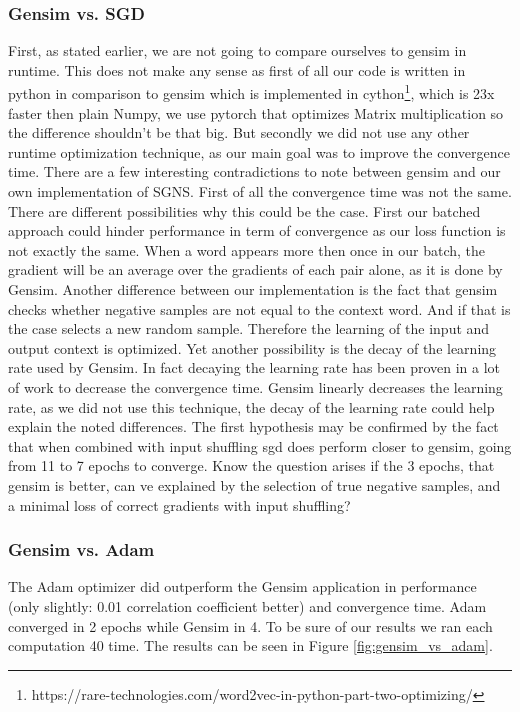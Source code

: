 \subsubsection{Gensim vs. SGD}
First, as stated earlier, we are not going to compare ourselves to gensim in runtime. This does not make any sense as first of all our code is written in python in comparison to gensim which is implemented in cython\footnote{https://rare-technologies.com/word2vec-in-python-part-two-optimizing/}, which is 23x faster then plain Numpy, we use pytorch that optimizes Matrix multiplication so the difference shouldn't be that big. But secondly we did not use any other runtime optimization technique, as our main goal was to improve the convergence time.
There are a few interesting contradictions to note between gensim and our own implementation of SGNS. First of all the convergence time was not the same. There are different possibilities why this could be the case. First our batched approach could hinder performance in term of convergence as our loss function is not exactly the same. When a word appears more then once in our batch, the gradient will be an average over the gradients of each pair alone, as it is done by Gensim. Another difference between our implementation is the fact that gensim checks whether negative samples are not equal to the context word. And if that is the case selects a new random sample. Therefore the learning of the input and output context is optimized. Yet another possibility is the decay of the learning rate used by Gensim. In fact decaying the learning rate has been proven in a lot of work to decrease the convergence time. Gensim linearly decreases the learning rate, as we did not use this technique, the decay of the learning rate could help explain the noted differences.
The first hypothesis may be confirmed by the fact that when combined with input shuffling sgd does perform closer to gensim, going from 11 to 7 epochs to converge. Know the question arises if the 3 epochs, that gensim is better, can ve explained by the selection of true negative samples, and a minimal loss of correct gradients with input shuffling?

\subsubsection{Gensim vs. Adam}
The Adam optimizer did outperform the Gensim application in performance (only slightly: 0.01 correlation coefficient better) and convergence time. Adam converged in 2 epochs while Gensim in 4. To be sure of our results we ran each computation 40 time. The results can be  seen in Figure \ref{fig:gensim_vs_adam}.

